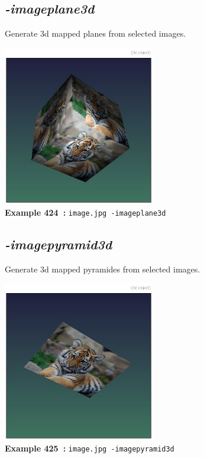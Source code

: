 \documentclass[a4paper,11pt,twoside]{book}
\begin{document}
\subsection{\emph{-imageplane3d} }\vspace*{-0.5em}
Generate 3d mapped planes from selected images.
\begin{center}\includegraphics[keepaspectratio=true,height=7cm,width=\textwidth]{img/gmic_def424.jpg}\\
{\footnotesize \textbf{Example 424~:} \texttt{image.jpg -imageplane3d}}
\end{center}

\subsection{\emph{-imagepyramid3d} }\vspace*{-0.5em}
Generate 3d mapped pyramides from selected images.
\begin{center}\includegraphics[keepaspectratio=true,height=7cm,width=\textwidth]{img/gmic_def425.jpg}\\
{\footnotesize \textbf{Example 425~:} \texttt{image.jpg -imagepyramid3d}}
\end{center}
\end{document}
